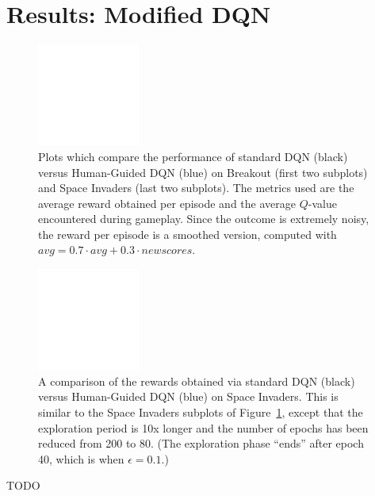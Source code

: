 \documentclass[letterpaper, 10pt, conference]{ieeeconf}
\begin{document}
\section{Results: Modified DQN}\label{sec:results_p2}

\begin{figure}[t]
\centering
\includegraphics[width=0.30\textwidth]{figures/empty.png}
\caption{\footnotesize
Plots which compare the performance of standard DQN (black) versus Human-Guided
DQN (blue) on Breakout (first two subplots) and Space Invaders (last two
subplots). The metrics used are the average reward obtained per episode
and the average $Q$-value encountered during gameplay. Since the outcome is
extremely noisy, the reward per episode is a smoothed version, computed with
$avg = 0.7\cdot avg + 0.3\cdot newscores$.
}
\label{fig:human_dqn_performance}
\end{figure}

\begin{figure}[t]
\centering
\includegraphics[width=0.30\textwidth]{figures/empty.png}
\caption{\footnotesize
A comparison of the rewards obtained via standard DQN (black) versus
Human-Guided DQN (blue) on Space Invaders. This is similar to the Space Invaders
subplots of Figure~\ref{fig:human_dqn_performance}, except that the exploration
period is 10x longer and the number of epochs has been reduced from 200 to 80.
(The exploration phase ``ends'' after epoch 40, which is when $\epsilon=0.1$.)
}
\label{fig:sp_inv_longer_exploration}
\end{figure}

TODO
\end{document}

